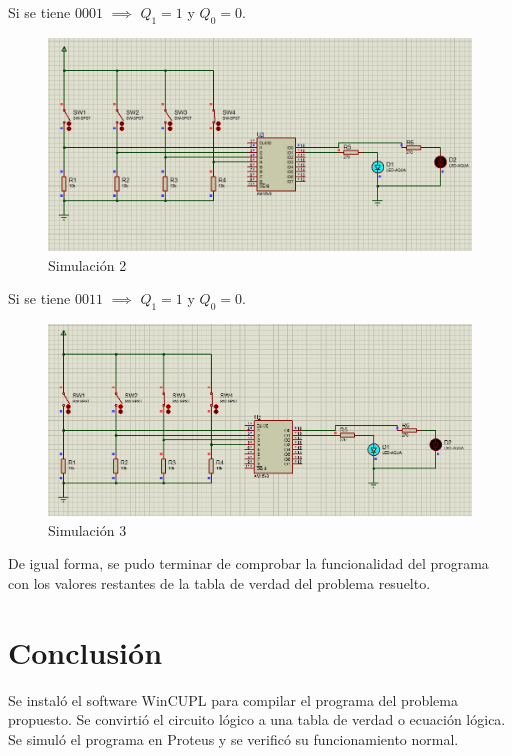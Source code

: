 \documentclass{article}
\begin{document}
    \bigbreak

    Si se tiene $0001$ $\implies$ $Q_1 = 1$ y $Q_0 = 0$.

    \begin{figure}[H]
        \centering
        \includegraphics[width=0.5\paperwidth]{images/proteus-sim-2}
        \caption{Simulación 2}
    \end{figure}

    \bigbreak

    Si se tiene $0011$ $\implies$ $Q_1 = 1$ y $Q_0 = 0$.

    \begin{figure}[H]
        \centering
        \includegraphics[width=0.5\paperwidth]{images/proteus-sim-3}
        \caption{Simulación 3}
    \end{figure}

    De igual forma, se pudo terminar de comprobar la funcionalidad del
    programa con los valores restantes de la tabla de verdad del problema
    resuelto.

    \section{Conclusión}\label{sec:conclusion}

    Se instaló el software WinCUPL para compilar el programa del problema
    propuesto. Se convirtió el circuito lógico a una tabla de verdad o
    ecuación lógica. Se simuló el programa en Proteus y se verificó su
    funcionamiento normal.

    \printbibliography
\end{document}
